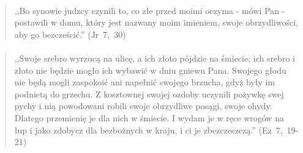 \documentclass[10pt,a4paper,oneside]{article}
\begin{document}
\paragraph{}
\begin{quote}
,,Bo synowie judzcy czynili to, co złe przed moimi oczyma - mówi Pan - postawili w domu, który jest nazwany moim imieniem, swoje obrzydliwości, aby go bezcześcić.'' \mbox{(Jr 7, 30)}
\end{quote}
\paragraph{}
\begin{quote}
,,Swoje srebro wyrzucą na ulicę, a ich złoto pójdzie na śmiecie; ich srebro i złoto nie będzie mogło ich wybawić w dniu gniewu Pana. Swojego głodu nie będą mogli zaspokoić ani napełnić swojego brzucha, gdyż były im podnietą do grzechu. Z kosztownej swojej ozdoby uczynili pożywkę swej pychy i nią powodowani robili swoje obrzydliwe posągi, swoje ohydy. Dlatego przemienię je dla nich w śmiecie. I wydam je w ręce wrogów na łup i jako zdobycz dla bezbożnych w kraju, i ci je zbezczeszczą.'' \mbox{(Ez 7, 19-21)}
\end{quote}
\end{document}
